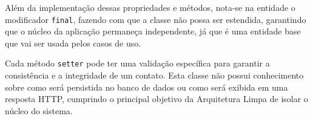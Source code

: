         \par Além da implementação dessas propriedades e métodos, nota-se na entidade o modificador \texttt{final}, fazendo com que a classe não possa ser estendida, garantindo que o núcleo da aplicação permaneça independente, já que é uma entidade base que vai ser usada pelos casos de uso.
        
        \par Cada método \texttt{setter} pode ter uma validação específica para garantir a consistência e a integridade de um contato. Esta classe não possui conhecimento sobre como será persistida no banco de dados ou como será exibida em uma resposta HTTP, cumprindo o principal objetivo da Arquitetura Limpa de isolar o núcleo do sistema.
